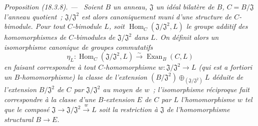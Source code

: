 \documentclass[10pt,oneside]{book}
\makeatletter
\newcommand{\setmanualcurrentlabel}[1]{\def\@currentlabel{#1}}
\newenvironment{proposition}[1][]{%
  \setmanualcurrentlabel{#1}\par\medskip\noindent\itshape Proposition (#1). ---\ }{\par}
\makeatother
\begin{document}
\begin{proposition}[18.3.8]
\label{0.18.3.8-fr}
Soient $B$ un anneau, $\mathfrak J$ un idéal bilatère de $B$,
$C=B/\mathfrak J$ l'anneau quotient~; $\mathfrak J/\mathfrak J^2$ est alors
canoniquement muni d'une structure de $C$-bimodule. Pour tout $C$-bimodule
$L$, soit $\operatorname{Hom}_C(\mathfrak J/\mathfrak J^2,L)$ le groupe
additif des homomorphismes de $C$-bimodules de $\mathfrak J/\mathfrak J^2$
dans $L$. On définit alors un isomorphisme canonique de groupes commutatifs
\begin{equation}
\label{0.18.3.8.1-fr}
\tag{18.3.8.1}
  \eta_L:\operatorname{Hom}_C(\mathfrak J/\mathfrak J^2,L)
  \xrightarrow{\sim}\operatorname{Exan}_B(C,L)
\end{equation}
en faisant correspondre à tout $C$-homomorphisme
$w:\mathfrak J/\mathfrak J^2\to L$ (qui est \emph{a fortiori} un
$B$-homomorphisme) la classe de l'extension
$(B/\mathfrak J^2)\oplus_{(\mathfrak J/\mathfrak J^2)}L$ déduite de
l'extension $B/\mathfrak J^2$ de $C$ par $\mathfrak J/\mathfrak J^2$ au moyen
de $w$~; l'isomorphisme réciproque fait correspondre à la classe d'une
$B$-extension $E$ de $C$ par $L$ l'homomorphisme $w$ tel que le composé
$\mathfrak J\to\mathfrak J/\mathfrak J^2\xrightarrow{w}L$ soit la restriction
à $\mathfrak J$ de l'homomorphisme structural $B\to E$.
\end{proposition}
\end{document}
